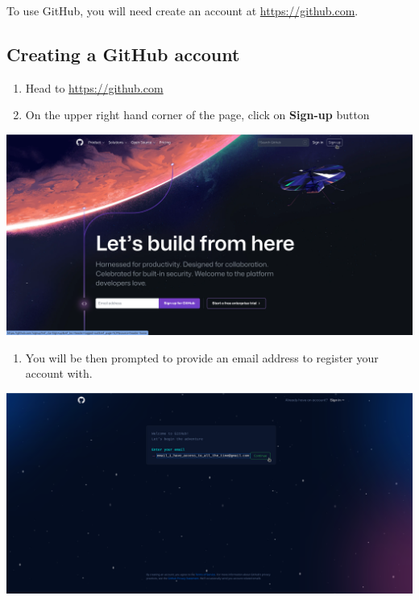 \documentclass[
  12pt,
]{book}
\providecommand{\tightlist}{%
  \setlength{\itemsep}{0pt}\setlength{\parskip}{0pt}}
\begin{document}
To use GitHub, you will need create an account at \url{https://github.com}.

\hypertarget{creating-a-github-account}{%
\subsection{Creating a GitHub account}\label{creating-a-github-account}}

\begin{enumerate}
\def\labelenumi{\arabic{enumi}.}
\item
  Head to \url{https://github.com}
\item
  On the upper right hand corner of the page, click on \textbf{Sign-up} button
\end{enumerate}

\includegraphics{images/github_account1.png}

\begin{enumerate}
\def\labelenumi{\arabic{enumi}.}
\setcounter{enumi}{2}
\tightlist
\item
  You will be then prompted to provide an email address to register your account with.
\end{enumerate}

\includegraphics{images/github_account2.png}
\end{document}
